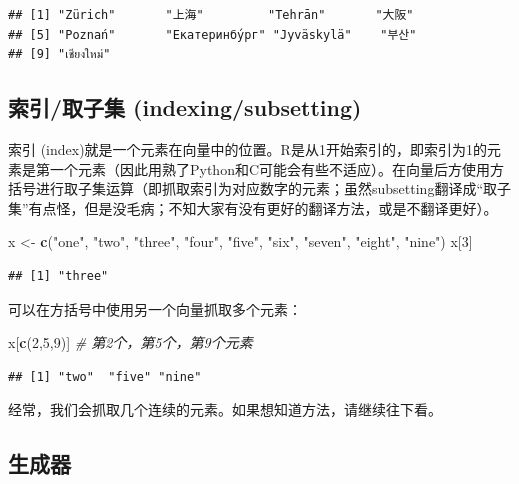 \documentclass[]{book}
\newenvironment{Shaded}{\begin{snugshade}}{\end{snugshade}}
\newcommand{\CommentTok}[1]{\textcolor[rgb]{0.56,0.35,0.01}{\textit{#1}}}
\newcommand{\DecValTok}[1]{\textcolor[rgb]{0.00,0.00,0.81}{#1}}
\newcommand{\KeywordTok}[1]{\textcolor[rgb]{0.13,0.29,0.53}{\textbf{#1}}}
\newcommand{\NormalTok}[1]{#1}
\newcommand{\StringTok}[1]{\textcolor[rgb]{0.31,0.60,0.02}{#1}}
\begin{document}
\begin{verbatim}
## [1] "Zürich"       "上海"         "Tehrān"       "大阪"        
## [5] "Poznań"       "Екатеринбу́рг" "Jyväskylä"    "부산"        
## [9] "เชียงใหม่"
\end{verbatim}

\hypertarget{indexing}{%
\subsection{索引/取子集 (indexing/subsetting)}\label{indexing}}

索引 (index)就是一个元素在向量中的位置。R是从1开始索引的，即索引为1的元素是第一个元素（因此用熟了Python和C可能会有些不适应）。在向量后方使用方括号进行取子集运算（即抓取索引为对应数字的元素；虽然subsetting翻译成``取子集''有点怪，但是没毛病；不知大家有没有更好的翻译方法，或是不翻译更好）。

\begin{Shaded}
\begin{Highlighting}[]
\NormalTok{x <-}\StringTok{ }\KeywordTok{c}\NormalTok{(}\StringTok{"one"}\NormalTok{, }\StringTok{"two"}\NormalTok{, }\StringTok{"three"}\NormalTok{, }\StringTok{"four"}\NormalTok{, }\StringTok{"five"}\NormalTok{, }\StringTok{"six"}\NormalTok{, }\StringTok{"seven"}\NormalTok{, }\StringTok{"eight"}\NormalTok{, }\StringTok{"nine"}\NormalTok{)}
\NormalTok{x[}\DecValTok{3}\NormalTok{]}
\end{Highlighting}
\end{Shaded}

\begin{verbatim}
## [1] "three"
\end{verbatim}

可以在方括号中使用另一个向量抓取多个元素：

\begin{Shaded}
\begin{Highlighting}[]
\NormalTok{x[}\KeywordTok{c}\NormalTok{(}\DecValTok{2}\NormalTok{,}\DecValTok{5}\NormalTok{,}\DecValTok{9}\NormalTok{)] }\CommentTok{# 第2个，第5个，第9个元素}
\end{Highlighting}
\end{Shaded}

\begin{verbatim}
## [1] "two"  "five" "nine"
\end{verbatim}

经常，我们会抓取几个连续的元素。如果想知道方法，请继续往下看。

\subsection{生成器}
\end{document}
